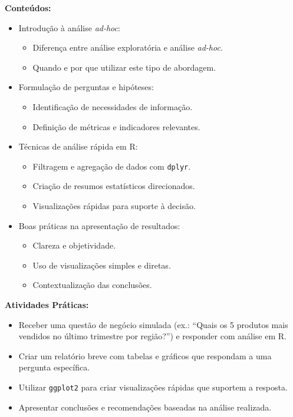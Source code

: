 \documentclass[12pt]{article}
\begin{document}
\textbf{Conteúdos:}
\begin{itemize}
  \item Introdução à análise \textit{ad-hoc}:
    \begin{itemize}
      \item Diferença entre análise exploratória e análise \textit{ad-hoc}.
      \item Quando e por que utilizar este tipo de abordagem.
    \end{itemize}
  \item Formulação de perguntas e hipóteses:
    \begin{itemize}
      \item Identificação de necessidades de informação.
      \item Definição de métricas e indicadores relevantes.
    \end{itemize}
  \item Técnicas de análise rápida em R:
    \begin{itemize}
      \item Filtragem e agregação de dados com \texttt{dplyr}.
      \item Criação de resumos estatísticos direcionados.
      \item Visualizações rápidas para suporte à decisão.
    \end{itemize}
  \item Boas práticas na apresentação de resultados:
    \begin{itemize}
      \item Clareza e objetividade.
      \item Uso de visualizações simples e diretas.
      \item Contextualização das conclusões.
    \end{itemize}
\end{itemize}

\textbf{Atividades Práticas:}
\begin{itemize}
  \item Receber uma questão de negócio simulada (ex.: “Quais os 5 produtos mais vendidos no último trimestre por região?”) e responder com análise em R.
  \item Criar um relatório breve com tabelas e gráficos que respondam a uma pergunta específica.
  \item Utilizar \texttt{ggplot2} para criar visualizações rápidas que suportem a resposta.
  \item Apresentar conclusões e recomendações baseadas na análise realizada.
\end{itemize}
\end{document}
